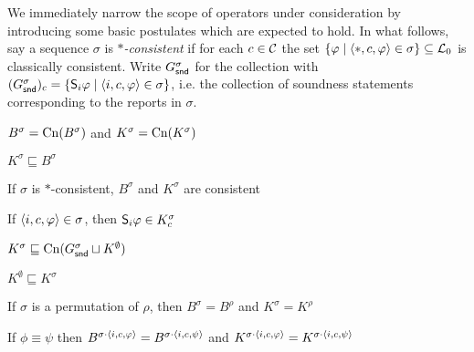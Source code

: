 We immediately narrow the scope of operators under consideration by introducing
some basic postulates which are expected to hold. In what follows, say a
sequence $\sigma$ is \emph{$\ast$-consistent} if for each $c \in \C$ the set
$\{\phi \mid \tuple{\ast, c, \phi} \in \sigma\} \subseteq \lprop$ is
classically consistent. Write $G^\sigma_\snd$ for the collection with
$(G^\sigma_\snd)_c = \{\S_i\phi \mid \tuple{i, c, \phi} \in \sigma\}$, i.e.
the collection of soundness statements corresponding to the reports in
$\sigma$.

\begin{axiomlist}
\begin{axiom}[\closure{}]
    $B^\sigma = \cn(B^\sigma)$ and  $K^\sigma = \cn(K^\sigma)$
\end{axiom}
\begin{axiom}[\containment{}]
    $K^\sigma \sqsubseteq B^\sigma$
\end{axiom}
\begin{axiom}[\consistency{}]
    If $\sigma$ is $\ast$-consistent, $B^\sigma$ and $K^\sigma$ are
    consistent
\end{axiom}
\begin{axiom}[\soundness{}]
    If $\tuple{i, c, \phi} \in \sigma$, then $\S_i\phi \in K^\sigma_c$
\end{axiom}
\begin{axiom}[\kbound{}]
    $K^\sigma \sqsubseteq \cn(G^\sigma_\snd \sqcup K^\emptyset)$
\end{axiom}
\begin{axiom}[\priorext{}]
    $K^\emptyset \sqsubseteq K^\sigma$
\end{axiom}
\begin{axiom}[\rearr{}]
    If $\sigma$ is a permutation of $\rho$, then $B^\sigma = B^\rho$ and
    $K^\sigma = K^\rho$
\end{axiom}
\begin{axiom}[\equivpost{}]
    If $\phi \equiv \psi$ then $B^{\sigma \concat \tuple{i, c, \phi}} = B^{\sigma
    \concat \tuple{i, c, \psi}}$ and $K^{\sigma \concat \tuple{i, c, \phi}} =
    K^{\sigma \concat \tuple{i, c, \psi}}$
\end{axiom}
\end{axiomlist}

